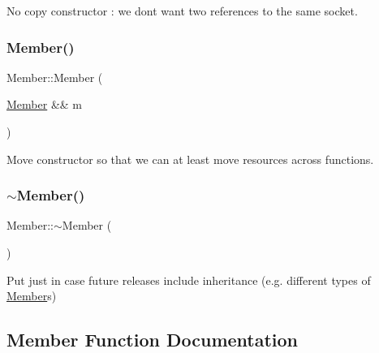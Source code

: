 No copy constructor \+: we don\textquotesingle{}t want two references to the same socket. 

\mbox{\label{classshaan97_1_1sync_1_1_member_a1a431ee2c09919b3f0243999078814ce}} 
\subsubsection{\texorpdfstring{Member()}{Member()}\hspace{0.1cm}{\footnotesize\ttfamily [3/3]}}
{\footnotesize\ttfamily Member\+::\+Member (\begin{DoxyParamCaption}\item[{\hyperlink{classshaan97_1_1sync_1_1_member}{Member} \&\&}]{m }\end{DoxyParamCaption})}



Move constructor so that we can at least move resources across functions. 

\mbox{\label{classshaan97_1_1sync_1_1_member_a4f5d7cb8788247f65f10b5b81be4a4ab}} 
\subsubsection{\texorpdfstring{$\sim$\+Member()}{~Member()}}
{\footnotesize\ttfamily Member\+::$\sim$\+Member (\begin{DoxyParamCaption}{ }\end{DoxyParamCaption})\hspace{0.3cm}{\ttfamily [virtual]}}



Put just in case future releases include inheritance (e.\+g. different types of {\ttfamily \hyperlink{classshaan97_1_1sync_1_1_member}{Member}}s) 



\subsection{Member Function Documentation}
\mbox{\label{classshaan97_1_1sync_1_1_member_a9b6eb1387361250d01764797f89bdc1a}} 
